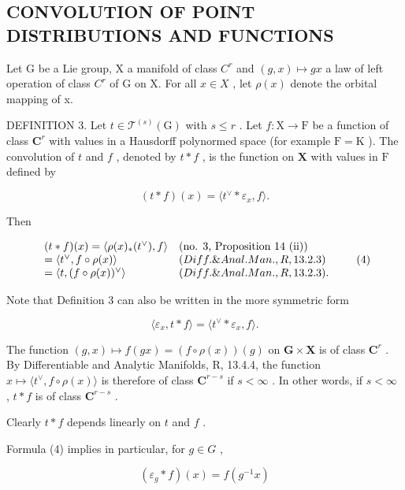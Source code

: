 \subsection{CONVOLUTION OF POINT DISTRIBUTIONS AND FUNCTIONS}

Let G be a Lie group, X a manifold of class \(C^{r}\) and \((g, x) \mapsto gx\) a law of left operation of class \(C^{r}\) of G on X. For all \(x \in X\) , let \(\rho(x)\) denote the orbital mapping of x.

DEFINITION 3. Let \(t \in \mathcal{T}^{(s)}(\mathrm{G})\) with \(s \leqslant r\) . Let \(f: \mathrm{X} \to \mathrm{F}\) be a function of class \(\mathbf{C}^r\) with values in a Hausdorff polynormed space (for example \(\mathrm{F} = \mathrm{K}\) ). The convolution of \(t\) and \(f\) , denoted by \(t * f\) , is the function on \(\mathbf{X}\) with values in \(\mathrm{F}\) defined by

\[
(t * f) (x) = \langle t ^ {\vee} * \varepsilon_ {x}, f \rangle .
\]

Then

\[
\begin{array}{l l} (t * f) (x) = \langle \rho (x) _ {*} (t ^ {\vee}), f \rangle & (\text {no. 3, Proposition 14 (ii)}) \\ = \langle t ^ {\vee}, f \circ \rho (x) \rangle & (Diff. \& Anal. Man., R, 13.2.3) \\ = \langle t, (f \circ \rho (x)) ^ {\vee} \rangle & (Diff. \& Anal. Man., R, 13.2.3). \end{array}\tag{4}
\]

Note that Definition 3 can also be written in the more symmetric form

\[
\langle \varepsilon_ {x}, t * f \rangle = \langle t ^ {\vee} * \varepsilon_ {x}, f \rangle .\tag{5}
\]

The function \((g,x)\mapsto f(gx) = (f\circ \rho (x))(g)\) on \(\mathbf{G}\times \mathbf{X}\) is of class \(\mathbf{C}^r\) . By Differentiable and Analytic Manifolds, R, 13.4.4, the function \(x\mapsto \langle t^\vee,f\circ \rho (x)\rangle\) is therefore of class \(\mathbf{C}^{r - s}\) if \(s < \infty\) . In other words, if \(s < \infty\) , \(t*f\) is of class \(\mathbf{C}^{r - s}\) .

Clearly \(t * f\) depends linearly on \(t\) and \(f\) .

Formula (4) implies in particular, for \(g \in G\) ,

\[
\left(\varepsilon_ {g} * f\right) (x) = f \left(g ^ {- 1} x\right)\tag{6}
\]

